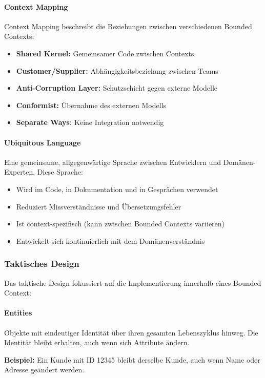 \paragraph{Context Mapping}
Context Mapping beschreibt die Beziehungen zwischen verschiedenen Bounded Contexts:
\begin{itemize}
\item \textbf{Shared Kernel:} Gemeinsamer Code zwischen Contexts
\item \textbf{Customer/Supplier:} Abhängigkeitsbeziehung zwischen Teams
\item \textbf{Anti-Corruption Layer:} Schutzschicht gegen externe Modelle
\item \textbf{Conformist:} Übernahme des externen Modells
\item \textbf{Separate Ways:} Keine Integration notwendig
\end{itemize}

\paragraph{Ubiquitous Language}
Eine gemeinsame, allgegenwärtige Sprache zwischen Entwicklern und Domänen-Experten. Diese Sprache:
\begin{itemize}
\item Wird im Code, in Dokumentation und in Gesprächen verwendet
\item Reduziert Missverständnisse und Übersetzungsfehler
\item Ist context-spezifisch (kann zwischen Bounded Contexts variieren)
\item Entwickelt sich kontinuierlich mit dem Domänenverständnis
\end{itemize}

\subsubsection{Taktisches Design}
\label{subsubsec:ddd-tactical}

Das taktische Design fokussiert auf die Implementierung innerhalb eines Bounded Context:

\paragraph{Entities}
Objekte mit eindeutiger Identität über ihren gesamten Lebenszyklus hinweg. Die Identität bleibt erhalten, auch wenn sich Attribute ändern.

\textbf{Beispiel:} Ein Kunde mit ID 12345 bleibt derselbe Kunde, auch wenn Name oder Adresse geändert werden.

